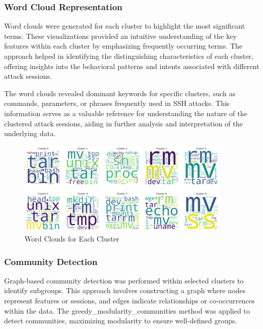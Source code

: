         \subsubsection{Word Cloud Representation \\}

        Word clouds were generated for each cluster to highlight the most significant terms. These visualizations provided an intuitive understanding of the key features within each cluster by emphasizing frequently occurring terms. The approach helped in identifying the distinguishing characteristics of each cluster, offering insights into the behavioral patterns and intents associated with different attack sessions.

        The word clouds revealed dominant keywords for specific clusters, such as commands, parameters, or phrases frequently used in SSH attacks. This information serves as a valuable reference for understanding the nature of the clustered attack sessions, aiding in further analysis and interpretation of the underlying data.


            \begin{figure}[H]
                \centering
                \includegraphics[width=0.9\textwidth]{../figures/plots/section3/circular_wordclouds.png}
                \caption{Word Clouds for Each Cluster}
                \label{fig:word_clouds}
            \end{figure}
            
            \subsubsection{Community Detection \\}
            Graph-based community detection was performed within selected clusters to identify subgroups. This approach involves constructing a graph where nodes represent features or sessions, and edges indicate relationships or co-occurrences within the data. The greedy\_modularity\_communities method was applied to detect communities, maximizing modularity to ensure well-defined groups.
            
